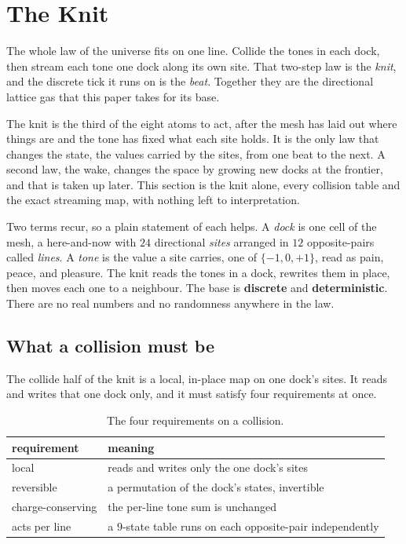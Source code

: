 \section{The Knit}

The whole law of the universe fits on one line. Collide the tones in each dock, then stream each tone one dock along its own site. That two-step law is the \emph{knit}, and the discrete tick it runs on is the \emph{beat}. Together they are the directional lattice gas that this paper takes for its base.

The knit is the third of the eight atoms to act, after the mesh has laid out where things are and the tone has fixed what each site holds. It is the only law that changes the state, the values carried by the sites, from one beat to the next. A second law, the wake, changes the space by growing new docks at the frontier, and that is taken up later. This section is the knit alone, every collision table and the exact streaming map, with nothing left to interpretation.

Two terms recur, so a plain statement of each helps. A \emph{dock} is one cell of the mesh, a here-and-now with $24$ directional \emph{sites} arranged in $12$ opposite-pairs called \emph{lines}. A \emph{tone} is the value a site carries, one of $\{-1, 0, +1\}$, read as pain, peace, and pleasure. The knit reads the tones in a dock, rewrites them in place, then moves each one to a neighbour. The base is \textbf{discrete} and \textbf{deterministic}. There are no real numbers and no randomness anywhere in the law.

\subsection{What a collision must be}

The collide half of the knit is a local, in-place map on one dock's sites. It reads and writes that one dock only, and it must satisfy four requirements at once.

\begin{table}[ht]
\centering
\begin{tabular}{@{}ll@{}}
\toprule
requirement & meaning \\
\midrule
local & reads and writes only the one dock's sites \\
reversible & a permutation of the dock's states, invertible \\
charge-conserving & the per-line tone sum is unchanged \\
acts per line & a $9$-state table runs on each opposite-pair independently \\
\bottomrule
\end{tabular}
\caption{The four requirements on a collision.}
\label{tab:collision-requirements}
\end{table}

